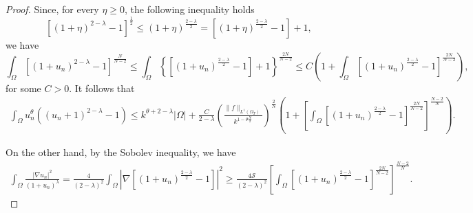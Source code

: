 \documentclass{amsart}
\numberwithin{equation}{section}
\def\elleomT#1{L^{#1}(\Omega_T)}
\def\io{\int_\Omega}
\def\norma#1#2{ \|#1 \|_{#2}}
\newcommand{\abs}[1]{\left|#1\right|}
\begin{document}
\begin{proof}
    Since, for every $\eta\geq0$, the following inequality holds
    $$
    \left[(1+\eta)^{2-\lambda}-1\right]^{\frac{1}{2}} \leq(1+\eta)^{\frac{2-\lambda}{2}}=\left[(1+\eta)^{\frac{2-\lambda}{2}}-1\right]+1,
    $$
    we have
    $$
    \io\left[\left(1+u_n\right)^{2-\lambda}-1\right]^{\frac{N}{N-2}} 
    \leq 
    \io\left\{\left[\left(1+u_n\right)^{\frac{2-\lambda}{2}}-1\right]+1\right\}^{{\frac{2N}{N-2}}} 
    \leq 
    C \left(1+\io\left[\left(1+u_n\right)^{\frac{2-\lambda}{2}}-1\right]^{{\frac{2N}{N-2}}}\right),
    $$
    for some $C>0$.
    It follows that
        \begin{equation}\label{eq:proof:stima1**:eq3}
        \begin{split}
            \io u_n^{\theta} \left((u_n+1)^{2-\lambda}-1\right)
    \leq 
    k^{\theta+2-\lambda}\abs{\Omega}
    +    \frac{C}{2-\lambda}
    \left(\frac{\norma{f}{\elleomT1}}{k^{1-\theta\frac{N}{2}}}\right)^\frac{2}{N}
    \left(1+\left[\io\left[\left(1+u_n\right)^{\frac{2-\lambda}{2}}-1\right]^{{\frac{2N}{N-2}}}\right]^{\frac{N-2}{N}}\right).
        \end{split}
    \end{equation}

    On the other hand, by the Sobolev inequality, we have
    \begin{equation}\label{eq:proof:stima1**:eq2}
        \begin{split}
            \io \frac{\left|\nabla u_n\right|^2}{\left(1+u_n\right)^\lambda}=
    \frac{4}{(2-\lambda)^2} \int_{\Omega}\left|\nabla\left[\left(1+u_n\right)^{\frac{2-\lambda}{2}}-1\right]\right|^2 \geq 
    \frac{4 \mathcal{S}}{(2-\lambda)^2}\left[\int_{\Omega}\left[\left(1+u_n\right)^{\frac{2-\lambda}{2}}-1\right]^{{\frac{2N}{N-2}}}\right]^{\frac{N-2}{N}}.
        \end{split}
    \end{equation}
    

\end{proof}
\end{document}
